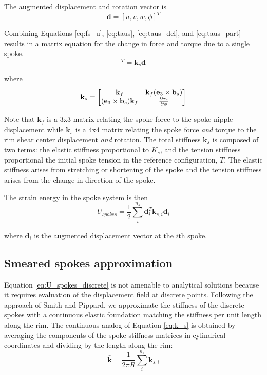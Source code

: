 \documentclass[\rootdir/thesis.tex]{subfiles}
\begin{document}
The augmented displacement and rotation vector is
\begin{equation}
\mathbf{d} = [u, v, w, \phi]^T
\end{equation}

Combining Equations \eqref{eq:fs_u}, \eqref{eq:taus}, \eqref{eq:taus_del}, and \eqref{eq:taus_part} results in a matrix equation for the change in force and torque due to a single spoke.
\begin{equation}
[\Delta f_{s1}, \Delta f_{s1}, \Delta f_{s3}, \Delta\tau_s]^T = \mathbf{k}_s \mathbf{d}
\end{equation}

where
\begin{equation}
\label{eq:k_s}
\mathbf{k}_s =
\begin{bmatrix}
\mathbf{k}_f                    & \mathbf{k}_f (\mathbf{e}_3\times\mathbf{b}_s)\\
(\mathbf{e}_3\times\mathbf{b}_s) \mathbf{k}_f & \frac{\partial\tau_s}{\partial\phi}
\end{bmatrix}
\end{equation}

Note that $\mathbf{k}_f$ is a 3x3 matrix relating the spoke force to the spoke nipple displacement while $\mathbf{k}_s$ is a 4x4 matrix relating the spoke force \emph{and} torque to the rim shear center displacement \emph{and} rotation. The total stiffness $\mathbf{k}_s$ is composed of two terms: the elastic stiffness proportional to $K_s$, and the tension stiffness proportional the initial spoke tension in the reference configuration, $T$. The elastic stiffness arises from stretching or shortening of the spoke and the tension stiffness arises from the change in direction of the spoke.

The strain energy in the spoke system is then
\begin{equation}
\label{eq:U_spokes_discrete}
U_{spokes} = \frac{1}{2} \sum_i^{n_s} \mathbf{d}_i^T \mathbf{k}_{s,i} \mathbf{d}_i
\end{equation}

where $\mathbf{d}_i$ is the augmented displacement vector at the $i$th spoke.

\subsection{Smeared spokes approximation}
Equation \ref{eq:U_spokes_discrete} is not amenable to analytical solutions because it requires evaluation of the displacement field at discrete points. Following the approach of Smith\cite{Smith} and Pippard\cite{Pippard}, we approximate the stiffness of the discrete spokes with a continuous elastic foundation matching the stiffness per unit length along the rim. The continuous analog of Equation \eqref{eq:k_s} is obtained by averaging the components of the spoke stiffness matrices in cylindrical coordinates and dividing by the length along the rim:
\begin{equation}
\label{eq:k_bar}
\mathbf{\bar{k}} = \frac{1}{2\pi R} \sum_i^{n_s} \mathbf{k}_{s,i}
\end{equation}
\end{document}
